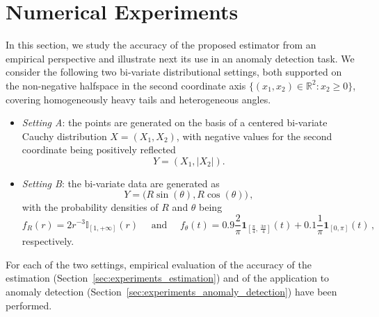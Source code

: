 \documentclass{article}
\numberwithin{equation}{section}
\newcommand{\R}{\mathbb{R}}
\newcommand{\I}{\mathbb{I}}
\begin{document}
\section{Numerical Experiments}\label{sec:experiments}
%
In this section, we study the accuracy of the proposed estimator from an empirical perspective and illustrate next its use in an anomaly detection task. We consider the following two bi-variate distributional settings, both supported on the non-negative halfspace in the second coordinate axis
$\{(x_1,x_2)\in\R^2: x_2\geq 0\}$, covering homogeneously heavy tails and heterogeneous angles.
\begin{itemize}
    \item \emph{Setting A}: the points are generated on the basis of a centered bi-variate Cauchy distribution $X=(X_1,X_2)$, with negative values for the second coordinate being positively reflected
    \begin{equation*}
        Y=(X_1, |X_2|).
    \end{equation*}
    \item \emph{Setting B}: the bi-variate data are generated as
    \begin{equation*}
        Y=\bigl( R\sin(\theta),R\cos(\theta) \bigr)\,,
    \end{equation*}
    with the probability densities of $R$ and $\theta$ being
    \begin{equation*}
        f_R(r) = 2r^{-3}\I_{[1,+\infty]}{(r)}\quad \text{ and } \quad
        f_\theta(t)
        =
        0.9\frac{2}{\pi}\mathbf{1}_{\left[\frac{\pi}{4},\,\frac{3\pi}{4}\right]}(t)
        +
        0.1\frac{1}{\pi}\mathbf{1}_{[0,\pi]}(t)\,,
    \end{equation*}
    respectively.
\end{itemize}

For each of the two settings, empirical evaluation of the accuracy of the estimation (Section~\ref{sec:experiments_estimation}) and of the application to anomaly detection (Section~\ref{sec:experiments_anomaly_detection}) have been performed.
\end{document}
